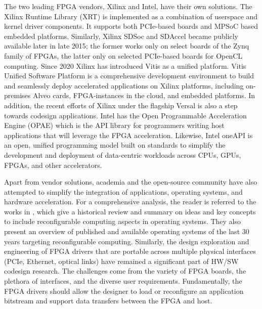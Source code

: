 
The two leading FPGA vendors, Xilinx and Intel, have their own solutions. The Xilinx Runtime Library (XRT) \cite{XRT} is implemented as a combination of userspace and kernel driver components. It supports both PCIe-based boards and MPSoC based embedded platforms. Similarly, Xilinx SDSoc \cite{sdsoc} and SDAccel \cite{sdaccel} became publicly available later in late 2015; the former works only on select boards of the Zynq family of FPGAs, the latter only on selected PCIe-based boards for OpenCL computing. Since 2020 Xilinx has introduced Vitis \cite{vitis} as a unified platform. Vitis Unified Software Platform is a comprehensive development environment to build and seamlessly deploy accelerated applications on Xilinx platforms, including on-premises Alveo cards, FPGA-instances in the cloud, and embedded platforms.
In addition, the recent efforts of Xilinx under the flagship Versal \cite{versal} is also a step towards codesign applications. Intel has the Open Programmable Acceleration Engine (OPAE) \cite{intelopae} which is the API library for programmers writing host applications that will leverage the FPGA acceleration. Likewise, Intel oneAPI \cite{inteloneapi} is an open, unified programming model built on standards to simplify the development and deployment of data-centric workloads across CPUs, GPUs, FPGAs, and other accelerators.

Apart from vendor solutions, academia and the open-source community have also attempted to simplify the integration of applications, operating systems, and hardware acceleration. For a comprehensive analysis, the reader is referred to the works in \cite{reconfig_os, connectal}, which give a historical review and summary on ideas and key concepts to include reconfigurable computing aspects in operating systems. They also present an overview of published and available operating systems of the last 30 years targeting reconfigurable computing. Similarly, the design exploration and engineering of FPGA drivers that are portable across multiple physical interfaces (PCIe, Ethernet, optical links) have remained a significant part of HW/SW codesign research. The challenges come from the variety of FPGA boards, the plethora of interfaces, and the diverse user requirements. Fundamentally, the FPGA drivers should allow the designer to load or reconfigure an application bitstream and support data transfers between the FPGA and host.

